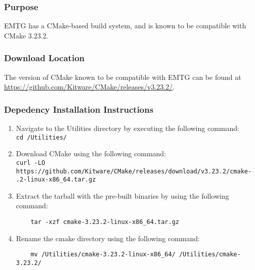 
\subsubsection{Purpose}

\ac{EMTG} has a CMake-based build system, and is known to be compatible with CMake 3.23.2. 

\subsubsection{Download Location}

The version of CMake known to be compatible with \ac{EMTG} can be found at \url{https://github.com/Kitware/CMake/releases/v3.23.2/}.

\subsubsection{Depedency Installation Instructions}

\begin{enumerate}
	\item Navigate to the Utilities directory by executing the following command: \\

	\texttt{cd /Utilities/}
	\item Download CMake using the following command: \\

	\texttt{curl -LO https://github.com/Kitware/CMake/releases/download/v3.23.2/cmake- \newline{}.2-linux-x86\_64.tar.gz}

	\item Extract the tarball with the pre-built binaries by using the following command:

	\begin{verbatim}
	tar -xzf cmake-3.23.2-linux-x86_64.tar.gz
	\end{verbatim}
	
	\item Rename the cmake directory using the following command:
	\begin{verbatim}
	mv /Utilities/cmake-3.23.2-linux-x86_64/ /Utilities/cmake-3.23.2/
	\end{verbatim}	
	
\end{enumerate}